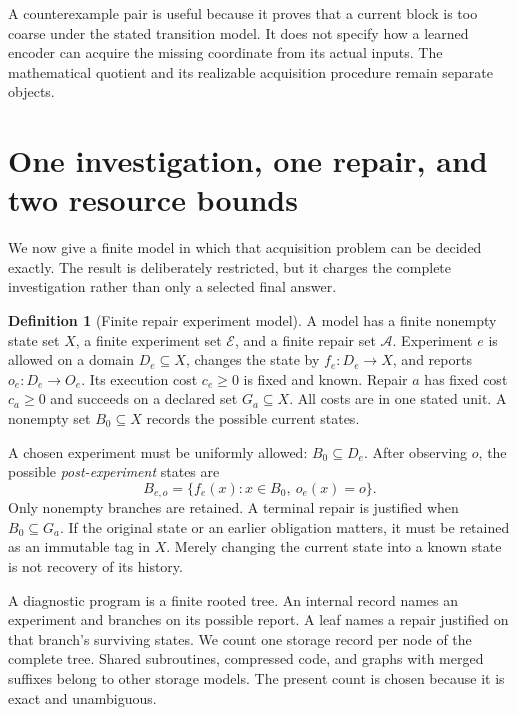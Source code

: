 \documentclass[11pt,letterpaper]{article}
\theoremstyle{plain}
\theoremstyle{definition}
\newtheorem{definition}[theorem]{Definition}
\begin{document}
A counterexample pair is useful because it proves that a current block is too coarse under the stated transition model. It does not specify how a learned encoder can acquire the missing coordinate from its actual inputs. The mathematical quotient and its realizable acquisition procedure remain separate objects.

\section{One investigation, one repair, and two resource bounds}\label{sec:synthesis}
We now give a finite model in which that acquisition problem can be decided exactly. The result is deliberately restricted, but it charges the complete investigation rather than only a selected final answer.

\begin{definition}[Finite repair experiment model]\label{def:repairmodel}
A model has a finite nonempty state set $X$, a finite experiment set $\mathcal E$, and a finite repair set $\mathcal A$. Experiment $e$ is allowed on a domain $D_e\subseteq X$, changes the state by $f_e:D_e\to X$, and reports $o_e:D_e\to O_e$. Its execution cost $c_e\geq0$ is fixed and known. Repair $a$ has fixed cost $c_a\geq0$ and succeeds on a declared set $G_a\subseteq X$. All costs are in one stated unit. A nonempty set $B_0\subseteq X$ records the possible current states.
\end{definition}

A chosen experiment must be uniformly allowed: $B_0\subseteq D_e$. After observing $o$, the possible \emph{post-experiment} states are
\begin{equation}\label{eq:post}
B_{e,o}=\{f_e(x):x\in B_0,\ o_e(x)=o\}.
\end{equation}
Only nonempty branches are retained. A terminal repair is justified when $B_0\subseteq G_a$. If the original state or an earlier obligation matters, it must be retained as an immutable tag in $X$. Merely changing the current state into a known state is not recovery of its history.

A diagnostic program is a finite rooted tree. An internal record names an experiment and branches on its possible report. A leaf names a repair justified on that branch's surviving states. We count one storage record per node of the complete tree. Shared subroutines, compressed code, and graphs with merged suffixes belong to other storage models. The present count is chosen because it is exact and unambiguous.
\end{document}
